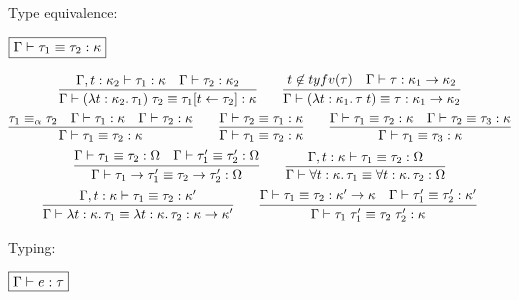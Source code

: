 Type equivalence:

$\fbox{$\Gamma \vdash \tau_1 \equiv \tau_2: \kappa$}$

\begin{gather*}
  \infer{\Gamma \vdash (\lambda t: \kappa_2\ldotp \tau_1)\; \tau_2 \equiv \tau_1[t \assign \tau_2]: \kappa}{
    \Gamma, t: \kappa_2 \vdash \tau_1: \kappa
    &
    \Gamma \vdash \tau_2: \kappa_2
  }
  \hspace{2em}
  \infer{\Gamma \vdash (\lambda t: \kappa_1\ldotp \tau\; t) \equiv \tau: \kappa_1 \to \kappa_2}{
    t \not\in \typefreevar(\tau)
    &
    \Gamma \vdash \tau: \kappa_1 \to \kappa_2
  }
  \\
  \infer{\Gamma \vdash \tau_1 \equiv \tau_2: \kappa}{
    \tau_1 \equiv_\alpha \tau_2
    &
    \Gamma \vdash \tau_1: \kappa
    &
    \Gamma \vdash \tau_2: \kappa
  }
  \hspace{2em}
  \infer{\Gamma \vdash \tau_1 \equiv \tau_2: \kappa}{
    \Gamma \vdash \tau_2 \equiv \tau_1: \kappa
  }
  \hspace{2em}
  \infer{\Gamma \vdash \tau_1 \equiv \tau_3: \kappa}{
    \Gamma \vdash \tau_1 \equiv \tau_2: \kappa
    &
    \Gamma \vdash \tau_2 \equiv \tau_3: \kappa
  }
  \\
  \infer{\Gamma \vdash \tau_1 \to \tau'_1 \equiv \tau_2 \to \tau'_2: \Omega}{
    \Gamma \vdash \tau_1 \equiv \tau_2: \Omega
    &
    \Gamma \vdash \tau'_1 \equiv \tau'_2: \Omega
  }
  \hspace{2em}
  \infer{\Gamma \vdash \forall t: \kappa\ldotp \tau_1 \equiv \forall t: \kappa\ldotp \tau_2: \Omega}{
    \Gamma, t: \kappa \vdash \tau_1 \equiv \tau_2: \Omega
  }
  \\
  \infer{\Gamma \vdash \lambda t: \kappa\ldotp \tau_1 \equiv \lambda t: \kappa\ldotp \tau_2: \kappa \to \kappa'}{
    \Gamma, t: \kappa \vdash \tau_1 \equiv \tau_2: \kappa'
  }
  \hspace{2em}
  \infer{\Gamma \vdash \tau_1\; \tau'_1 \equiv \tau_2\; \tau'_2: \kappa}{
    \Gamma \vdash \tau_1 \equiv \tau_2: \kappa' \to \kappa
    &
    \Gamma \vdash \tau'_1 \equiv \tau'_2: \kappa'
  }
\end{gather*}

Typing:

$\fbox{$\Gamma \vdash e: \tau$}$

